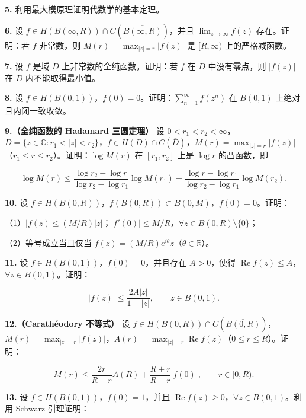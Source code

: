 \documentclass[11pt,a4paper]{article}
\begin{document}
\par{}
\noindent\textbf{5.} 利用最大模原理证明代数学的基本定理。

\par{}
\noindent\textbf{6.} 设
\(f\in H(B(\infty,R))\cap C(\overline{B(\infty,R)})\)，并且
\(\lim_{z\to\infty}f(z)\) 存在。证明：若 \(f\) 非常数，则
\(M(r)=\max_{|z|=r}|f(z)|\) 是 \([R,\infty)\) 上的严格减函数。

\par{}
\noindent\textbf{7.} 设 \(f\) 是域 \(D\) 上非常数的全纯函数。证明：若 \(f\) 在
\(D\) 中没有零点，则 \(|f(z)|\) 在 \(D\) 内不能取得最小值。

\par{}
\noindent\textbf{8.} 设
\(f\in H(B(0,1))\)，\(f(0)=0\)。证明：\(\sum_{n=1}^{\infty}f(z^n)\) 在
\(B(0,1)\) 上绝对且内闭一致收敛。

\textbf{9.（全纯函数的 Hadamard 三圆定理）} 设
\(0<r_1<r_2<\infty\)，\(D=\{z\in\mathbb C:r_1<|z|<r_2\}\)，\(f\in H(D)\cap C(\overline D)\)，\(M(r)=\max_{|z|=r}|f(z)|\)（\(r_1\le r\le r_2\)）。证明：\(\log M(r)\)
在 \([r_1,r_2]\) 上是 \(\log r\) 的凸函数，即

\[
\log M(r)\le
\frac{\log r_2-\log r}{\log r_2-\log r_1}\log M(r_1)
+\frac{\log r-\log r_1}{\log r_2-\log r_1}\log M(r_2).
\]

\par{}
\noindent\textbf{10.} 设
\(f\in H(B(0,R))\)，\(f(B(0,R))\subset B(0,M)\)，\(f(0)=0\)。证明：

（1）\(|f(z)\le(M/R)|z|\)；\(|f'(0)|\le M/R\)，\(\forall z\in B(0,R)\setminus\{0\}\)；

（2）等号成立当且仅当
\(f(z)=(M/R)e^{i\theta}z\)（\(\theta\in\mathbb R\)）。

\par{}
\noindent\textbf{11.} 设 \(f\in H(B(0,1))\)，\(f(0)=0\)，并且存在 \(A>0\)，使得
\(\operatorname{Re}f(z)\le A\)，\(\forall z\in B(0,1)\)。证明：

\[
|f(z)|\le\frac{2A|z|}{1-|z|},\qquad z\in B(0,1).
\]

\textbf{12.（Carathéodory 不等式）} 设
\(f\in H(B(0,R))\cap C(\overline{B(0,R)})\)，\(M(r)=\max_{|z|=r}|f(z)|\)，\(A(r)=\max_{|z|=r}\operatorname{Re}f(z)\)（\(0\le r\le R\)）。证明：

\[
M(r)\le\frac{2r}{R-r}A(R)+\frac{R+r}{R-r}|f(0)|,\qquad r\in[0,R).
\]

\par{}
\noindent\textbf{13.} 设 \(f\in H(B(0,1))\)，\(f(0)=1\)，并且
\(\operatorname{Re}f(z)\ge0\)，\(\forall z\in B(0,1)\)。利用 Schwarz
引理证明：
\end{document}
